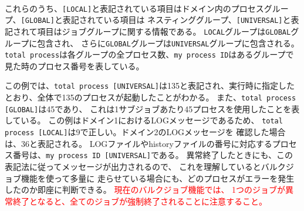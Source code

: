\\



これらのうち、\verb|[LOCAL]|と表記されている項目はドメイン内のプロセスグループ、\verb|[GLOBAL]|と表記されている項目は
ネスティンググループ、\verb|[UNIVERSAL]|と表記されて項目はジョブグループに関する情報である。
\verb|LOCAL|グループは\verb|GLOBAL|グループに包含され、
さらに\verb|GLOBAL|グループは\verb|UNIVERSAL|グループに包含される。
\verb|total process|は各グループの全プロセス数、\verb|my process ID|はあるグループで見た時のプロセス番号を表している。

この例では、\verb|total process [UNIVERSAL]|は135と表記され、実行時に指定したとおり、全体で135のプロセスが起動したことがわかる。
また、\verb|total process [GLOBAL]|は45であり、
これは1サブジョブあたり45プロセスを使用したことを表している。
この例はドメイン1におけるLOGメッセージであるため、
\verb|total process [LOCAL]|は9で正しい。ドメイン2のLOGメッセージを
確認した場合は、36と表記される。
LOGファイルやhistoryファイルの番号に対応するプロセス番号は、\verb|my process ID [UNIVERSAL]|である。
異常終了したときにも、この表記法に従ってメッセージが出力されるので、
これを理解しているとバルクジョブ機能を使って多量に
走らせている場合にも、どのプロセスがエラーを発生したのか即座に判断できる。
\textcolor{red}{現在のバルクジョブ機能では、
1つのジョブが異常終了となると、全てのジョブが強制終了されることに注意すること。}



